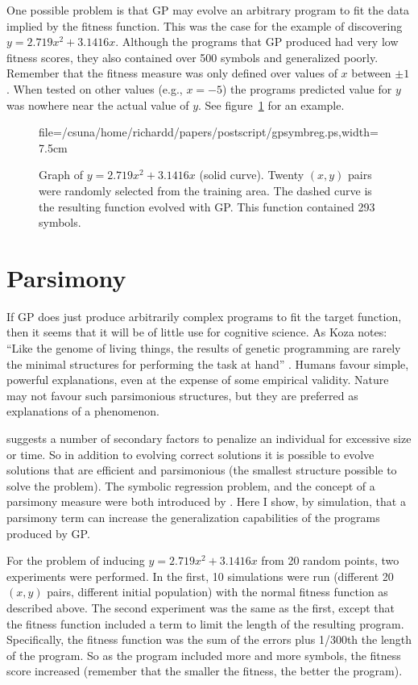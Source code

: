 One possible problem is that GP may evolve an arbitrary program to fit the
data implied by the fitness function.  This was the case for the example of
discovering $y=2.719x^2+3.1416x$.  Although the programs that GP produced
had very low fitness scores, they also contained over 500 symbols and
generalized poorly.  Remember that the fitness measure was only defined
over values of $x$ between $\pm1$. When tested on other values (e.g.,
$x=-5$) the programs predicted value for $y$ was nowhere near the actual
value of $y$. See figure~\ref{symbreg} for an example.

\begin{figure}
\centerline{\psfig%
{file=/csuna/home/richardd/papers/postscript/gpsymbreg.ps,width=7.5cm}}
\caption{Graph of $y=2.719x^2+3.1416x$ (solid curve).  Twenty $(x,y)$
pairs were randomly selected from the training area.  The dashed curve
is the resulting function evolved with GP.  This function contained 293
symbols.}\label{symbreg}
\end{figure}

\section*{Parsimony}

If GP does just produce arbitrarily complex programs to fit the target
function, then it seems that it will be of little use for cognitive
science. As Koza notes: ``Like the genome of living things, the results of
genetic programming are rarely the minimal structures for performing the
task at hand'' \citeyear[p.~7]{kozagp}. Humans favour simple, powerful
explanations, even at the expense of some empirical validity.  Nature may
not favour such parsimonious structures, but they are preferred as
explanations of a phenomenon.

 suggests a number of secondary factors
to penalize an individual for excessive size or time. So in addition to
evolving correct solutions it is possible to evolve solutions that are
efficient and parsimonious (the smallest structure possible to solve the
problem).  The symbolic regression problem, and the concept of a parsimony
measure were both introduced by .
Here I show, by simulation, that a parsimony term can increase the
generalization capabilities of the programs produced by GP.

For the problem of inducing $y=2.719x^2+3.1416x$ from 20 random points, two
experiments were performed.  In the first, 10 simulations were run
(different 20 $(x,y)$ pairs, different initial population) with the
normal fitness function as described above.  The second experiment was the
same as the first, except that the fitness function included a term to
limit the length of the resulting program.  Specifically, the fitness
function was the sum of the errors plus 1/300th the length of the program.
So as the program included more and more symbols, the fitness score
increased (remember that the smaller the fitness, the better the program).

